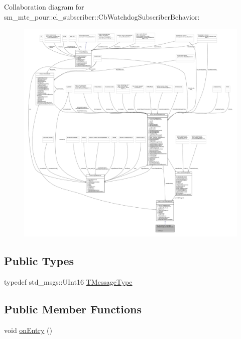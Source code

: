 Collaboration diagram for sm\+\_\+mtc\+\_\+pour\+:\+:cl\+\_\+subscriber\+:\+:Cb\+Watchdog\+Subscriber\+Behavior\+:
\nopagebreak
\begin{figure}[H]
\begin{center}
\leavevmode
\includegraphics[width=350pt]{classsm__mtc__pour_1_1cl__subscriber_1_1CbWatchdogSubscriberBehavior__coll__graph}
\end{center}
\end{figure}
\subsection*{Public Types}
\begin{DoxyCompactItemize}
\item 
typedef std\+\_\+msgs\+::\+U\+Int16 \hyperlink{classsm__mtc__pour_1_1cl__subscriber_1_1CbWatchdogSubscriberBehavior_a4af6eb500743e7a54f878b955797e4c3}{T\+Message\+Type}
\end{DoxyCompactItemize}
\subsection*{Public Member Functions}
\begin{DoxyCompactItemize}
\item 
void \hyperlink{classsm__mtc__pour_1_1cl__subscriber_1_1CbWatchdogSubscriberBehavior_adf9e6c5a0db461114c5a892a496b762b}{on\+Entry} ()
\end{DoxyCompactItemize}


